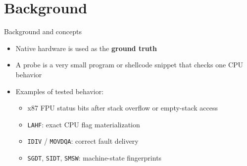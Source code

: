 \documentclass{beamer}
\begin{document}
\section{Background}
\begin{frame}{Background and concepts}
  \begin{itemize}
    \item Native hardware is used as the \textbf{ground truth}
    \item A probe is a very small program or shellcode snippet that checks one CPU behavior
    \item Examples of tested behavior:
      \begin{itemize}
        \item x87 FPU status bits after stack overflow or empty-stack access
        \item \texttt{LAHF}: exact CPU flag materialization
        \item \texttt{IDIV} / \texttt{MOVDQA}: correct fault delivery
        \item \texttt{SGDT}, \texttt{SIDT}, \texttt{SMSW}: machine-state fingerprints
      \end{itemize}
  \end{itemize}
\end{frame}
\end{document}
